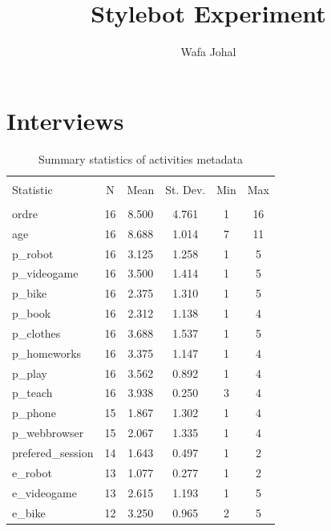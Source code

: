 \documentclass{article}
\title{Stylebot Experiment}
\author{Wafa Johal}
\begin{document}
\maketitle
\tableofcontents








\section{Interviews}
\begin{table}[!htbp] \centering 
  \caption{Summary statistics of activities metadata} 
  \label{} 
\begin{tabular}{@{\extracolsep{5pt}}lccccc} 
\\[-1.8ex]\hline 
\hline \\[-1.8ex] 
Statistic & \multicolumn{1}{c}{N} & \multicolumn{1}{c}{Mean} & \multicolumn{1}{c}{St. Dev.} & \multicolumn{1}{c}{Min} & \multicolumn{1}{c}{Max} \\ 
\hline \\[-1.8ex] 
ordre & 16 & 8.500 & 4.761 & 1 & 16 \\ 
age & 16 & 8.688 & 1.014 & 7 & 11 \\ 
p\_robot & 16 & 3.125 & 1.258 & 1 & 5 \\ 
p\_videogame & 16 & 3.500 & 1.414 & 1 & 5 \\ 
p\_bike & 16 & 2.375 & 1.310 & 1 & 5 \\ 
p\_book & 16 & 2.312 & 1.138 & 1 & 4 \\ 
p\_clothes & 16 & 3.688 & 1.537 & 1 & 5 \\ 
p\_homeworks & 16 & 3.375 & 1.147 & 1 & 4 \\ 
p\_play & 16 & 3.562 & 0.892 & 1 & 4 \\ 
p\_teach & 16 & 3.938 & 0.250 & 3 & 4 \\ 
p\_phone & 15 & 1.867 & 1.302 & 1 & 4 \\ 
p\_webbrowser & 15 & 2.067 & 1.335 & 1 & 4 \\ 
prefered\_session & 14 & 1.643 & 0.497 & 1 & 2 \\ 
e\_robot & 13 & 1.077 & 0.277 & 1 & 2 \\ 
e\_videogame & 13 & 2.615 & 1.193 & 1 & 5 \\ 
e\_bike & 12 & 3.250 & 0.965 & 2 & 5 \\ 

\end{tabular}
\end{table}
\end{document}

